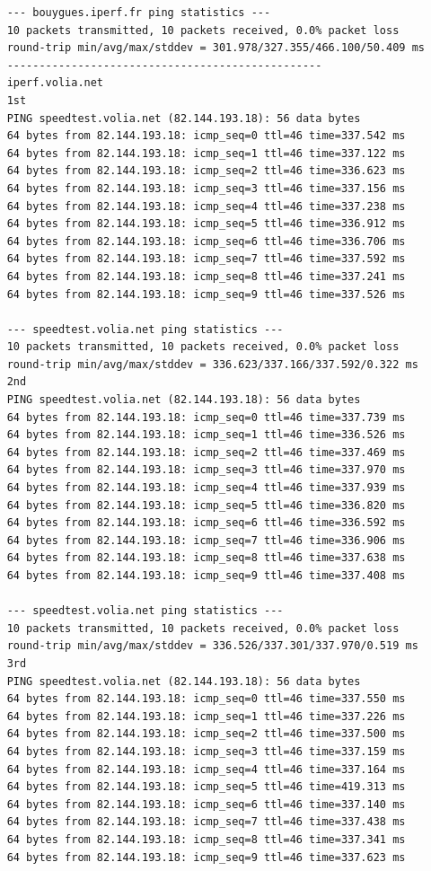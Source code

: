 \documentclass[paper=a4, fontsize=10pt]{scrartcl} %
\numberwithin{equation}{section} %
\numberwithin{figure}{section} %
\numberwithin{table}{section} %
\begin{document}
\begin{lstlisting}
    --- bouygues.iperf.fr ping statistics ---
    10 packets transmitted, 10 packets received, 0.0% packet loss
    round-trip min/avg/max/stddev = 301.978/327.355/466.100/50.409 ms
    -------------------------------------------------
    iperf.volia.net
    1st
    PING speedtest.volia.net (82.144.193.18): 56 data bytes
    64 bytes from 82.144.193.18: icmp_seq=0 ttl=46 time=337.542 ms
    64 bytes from 82.144.193.18: icmp_seq=1 ttl=46 time=337.122 ms
    64 bytes from 82.144.193.18: icmp_seq=2 ttl=46 time=336.623 ms
    64 bytes from 82.144.193.18: icmp_seq=3 ttl=46 time=337.156 ms
    64 bytes from 82.144.193.18: icmp_seq=4 ttl=46 time=337.238 ms
    64 bytes from 82.144.193.18: icmp_seq=5 ttl=46 time=336.912 ms
    64 bytes from 82.144.193.18: icmp_seq=6 ttl=46 time=336.706 ms
    64 bytes from 82.144.193.18: icmp_seq=7 ttl=46 time=337.592 ms
    64 bytes from 82.144.193.18: icmp_seq=8 ttl=46 time=337.241 ms
    64 bytes from 82.144.193.18: icmp_seq=9 ttl=46 time=337.526 ms
    
    --- speedtest.volia.net ping statistics ---
    10 packets transmitted, 10 packets received, 0.0% packet loss
    round-trip min/avg/max/stddev = 336.623/337.166/337.592/0.322 ms
    2nd
    PING speedtest.volia.net (82.144.193.18): 56 data bytes
    64 bytes from 82.144.193.18: icmp_seq=0 ttl=46 time=337.739 ms
    64 bytes from 82.144.193.18: icmp_seq=1 ttl=46 time=336.526 ms
    64 bytes from 82.144.193.18: icmp_seq=2 ttl=46 time=337.469 ms
    64 bytes from 82.144.193.18: icmp_seq=3 ttl=46 time=337.970 ms
    64 bytes from 82.144.193.18: icmp_seq=4 ttl=46 time=337.939 ms
    64 bytes from 82.144.193.18: icmp_seq=5 ttl=46 time=336.820 ms
    64 bytes from 82.144.193.18: icmp_seq=6 ttl=46 time=336.592 ms
    64 bytes from 82.144.193.18: icmp_seq=7 ttl=46 time=336.906 ms
    64 bytes from 82.144.193.18: icmp_seq=8 ttl=46 time=337.638 ms
    64 bytes from 82.144.193.18: icmp_seq=9 ttl=46 time=337.408 ms
    
    --- speedtest.volia.net ping statistics ---
    10 packets transmitted, 10 packets received, 0.0% packet loss
    round-trip min/avg/max/stddev = 336.526/337.301/337.970/0.519 ms
    3rd
    PING speedtest.volia.net (82.144.193.18): 56 data bytes
    64 bytes from 82.144.193.18: icmp_seq=0 ttl=46 time=337.550 ms
    64 bytes from 82.144.193.18: icmp_seq=1 ttl=46 time=337.226 ms
    64 bytes from 82.144.193.18: icmp_seq=2 ttl=46 time=337.500 ms
    64 bytes from 82.144.193.18: icmp_seq=3 ttl=46 time=337.159 ms
    64 bytes from 82.144.193.18: icmp_seq=4 ttl=46 time=337.164 ms
    64 bytes from 82.144.193.18: icmp_seq=5 ttl=46 time=419.313 ms
    64 bytes from 82.144.193.18: icmp_seq=6 ttl=46 time=337.140 ms
    64 bytes from 82.144.193.18: icmp_seq=7 ttl=46 time=337.438 ms
    64 bytes from 82.144.193.18: icmp_seq=8 ttl=46 time=337.341 ms
    64 bytes from 82.144.193.18: icmp_seq=9 ttl=46 time=337.623 ms
    

\end{lstlisting}
\end{document}
